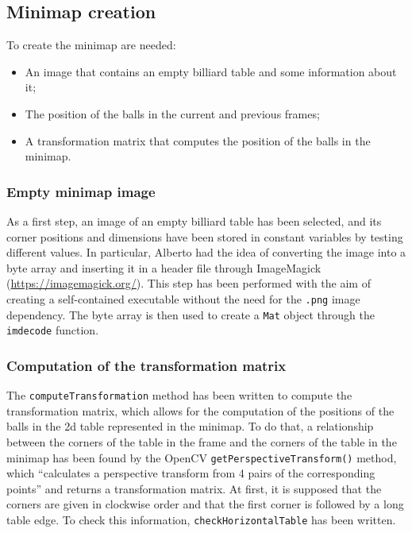 \subsection{Minimap creation}
To create the minimap are needed:
\begin{itemize}
	\item An image that contains an empty billiard table and some information about it;
	\item The position of the balls in the current and previous frames;
	\item A transformation matrix that computes the position of the balls in the minimap.
\end{itemize}

\subsubsection{Empty minimap image}
As a first step, an image of an empty billiard table has been selected, and its corner positions and dimensions have been stored in constant variables by testing different values. In particular, Alberto had the idea of converting the image into a byte array and inserting it in a header file through ImageMagick (\url{https://imagemagick.org/}).
This step has been performed with the aim of creating a self-contained executable without the need for the \texttt{.png} image dependency.
The byte array is then used to create a \texttt{Mat} object through the \texttt{imdecode} function.

\subsubsection{Computation of the transformation matrix}
The \texttt{computeTransformation} method has been written to compute the transformation matrix, which allows for the computation of the positions of the balls in the 2d table represented in the minimap. To do that, a relationship between the corners of the table in the frame and the corners of the table in the minimap has been found by the OpenCV \texttt{getPerspectiveTransform()} method, which “calculates a perspective transform from 4 pairs of the corresponding points” and returns a transformation matrix.
At first, it is supposed that the corners are given in clockwise order and that the first corner is followed by a long table edge. To check this information, \texttt{checkHorizontalTable} has been written.

